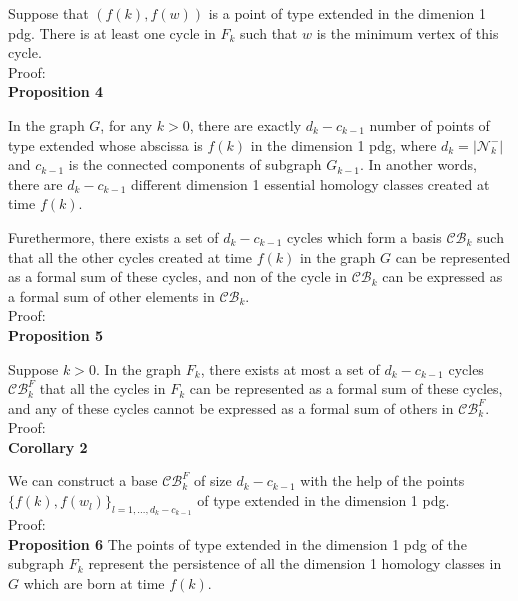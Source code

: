 \documentclass[a4paper,12pt]{article}
\numberwithin{equation}{section}
\begin{document}
	Suppose that $(f(k), f(w))$ is a point of type extended in the dimenion 1 pdg. There is at least one cycle in $F_k$ such that $w$ is the minimum vertex of this cycle.\\
	
	\noindent Proof:\\
	
	\noindent \textbf{Proposition 4}
	
	In the graph $G$, for any $k>0$, there are exactly $d_k - c_{k-1}$ number of points of type extended whose abscissa is $f(k)$ in the dimension 1 pdg, where $d_k = \vert \mathcal{N}^-_{k} \vert$ and $c_{k-1}$ is the connected components of subgraph $G_{k-1}$. In another words, there are $d_k - c_{k-1}$ different dimension 1 essential homology classes created at time $f(k)$.
	
	Furethermore, there exists a set of $d_k - c_{k-1}$ cycles which form a basis $\mathcal{CB}_k$ such that all the other cycles created at time $f(k)$ in the graph $G$ can be represented as a formal sum of these cycles, and non of the cycle in $\mathcal{CB}_k$ can be expressed as a formal sum of other elements in $\mathcal{CB}_k$.\\
	
	\noindent Proof:\\
	
	\noindent \textbf{Proposition 5}
	
	Suppose $k>0$. In the graph $F_k$, there exists at most a set of $d_k - c_{k-1}$ cycles $\mathcal{CB}^{F}_k$ that all the cycles in $F_k$ can be represented as a formal sum of these cycles, and any of these cycles cannot be expressed as a formal sum of others in $\mathcal{CB}^F_k$.\\
	
	\noindent Proof:\\
	
	\noindent \textbf{Corollary 2}
	
	We can construct a base $\mathcal{CB}^F_k$ of size $d_k - c_{k-1}$ with the help of the points $\{f(k), f(w_l)\}_{l =1,\ldots,d_k - c_{k-1}}$ of type extended in the dimension 1 pdg.\\
	
	\noindent Proof: \\
	
	\noindent \textbf{Proposition 6}
	The points of type extended in the dimension 1 pdg of the subgraph $F_k$ represent the persistence of all the dimension 1 homology classes in $G$ which are born at time $f(k)$. \\
	
\end{document}
